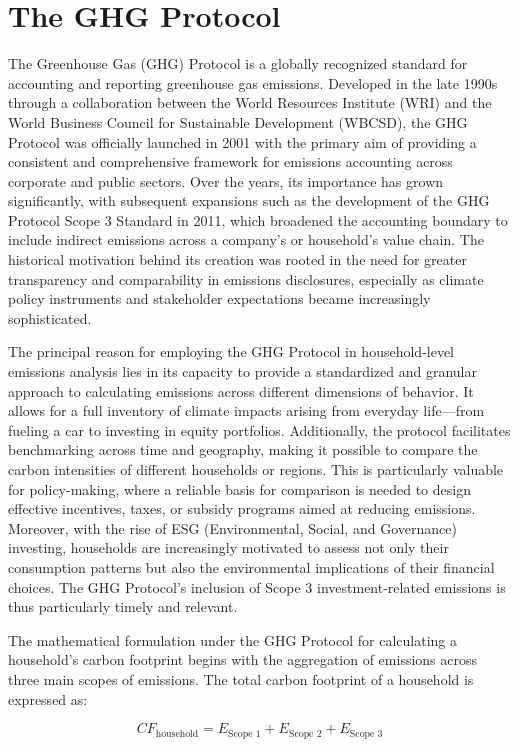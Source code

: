 \documentclass[12pt,a4paper]{article}%
\begin{document}
\section{The GHG Protocol}
The Greenhouse Gas (GHG) Protocol is a globally recognized standard for accounting and reporting greenhouse gas emissions. Developed in the late 1990s through a collaboration between the World Resources Institute (WRI) and the World Business Council for Sustainable Development (WBCSD), the GHG Protocol was officially launched in 2001 with the primary aim of providing a consistent and comprehensive framework for emissions accounting across corporate and public sectors. Over the years, its importance has grown significantly, with subsequent expansions such as the development of the GHG Protocol Scope 3 Standard in 2011, which broadened the accounting boundary to include indirect emissions across a company’s or household’s value chain. The historical motivation behind its creation was rooted in the need for greater transparency and comparability in emissions disclosures, especially as climate policy instruments and stakeholder expectations became increasingly sophisticated.

The principal reason for employing the GHG Protocol in household-level emissions analysis lies in its capacity to provide a standardized and granular approach to calculating emissions across different dimensions of behavior. It allows for a full inventory of climate impacts arising from everyday life—from fueling a car to investing in equity portfolios. Additionally, the protocol facilitates benchmarking across time and geography, making it possible to compare the carbon intensities of different households or regions. This is particularly valuable for policy-making, where a reliable basis for comparison is needed to design effective incentives, taxes, or subsidy programs aimed at reducing emissions. Moreover, with the rise of ESG (Environmental, Social, and Governance) investing, households are increasingly motivated to assess not only their consumption patterns but also the environmental implications of their financial choices. The GHG Protocol's inclusion of Scope 3 investment-related emissions is thus particularly timely and relevant.

The mathematical formulation under the GHG Protocol for calculating a household’s carbon footprint begins with the aggregation of emissions across three main scopes of emissions. The total carbon footprint of a household is expressed as:

\begin{equation}
CF_{\text{household}} = E_{\text{Scope 1}} + E_{\text{Scope 2}} + E_{\text{Scope 3}}
\end{equation}
\end{document}
